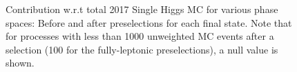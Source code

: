 \begin{figure}[H]
	\caption{Contribution w.r.t total 2017 Single Higgs MC for various phase spaces: Before and after preselections for each final state. Note that for processes with less than 1000 unweighted MC events after a selection (100 for the fully-leptonic preselections), a null value is shown.}
	\label{fig:Single_Higgs_Contribution_Table} 
\end{figure}

